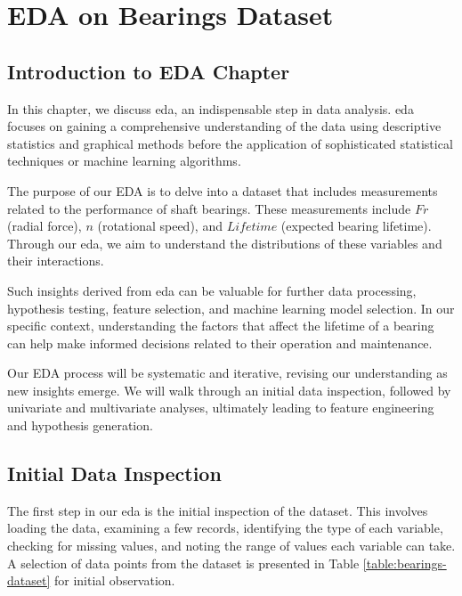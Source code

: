 \chapter{EDA on Bearings Dataset}
\label{sec:bearings-eda}


\section{Introduction to EDA Chapter}

In this chapter, we discuss \ac{eda}, an indispensable step in data analysis. \ac{eda} focuses on gaining a comprehensive understanding of the data using descriptive statistics and graphical methods before the application of sophisticated statistical techniques or machine learning algorithms.

The purpose of our EDA is to delve into a dataset that includes measurements related to the performance of shaft bearings. These measurements include \(Fr\) (radial force), \(n\) (rotational speed), and \(Lifetime\) (expected bearing lifetime). Through our \ac{eda}, we aim to understand the distributions of these variables and their interactions.

Such insights derived from \ac{eda} can be valuable for further data processing, hypothesis testing, feature selection, and machine learning model selection. In our specific context, understanding the factors that affect the lifetime of a bearing can help make informed decisions related to their operation and maintenance.

Our EDA process will be systematic and iterative, revising our understanding as new insights emerge. We will walk through an initial data inspection, followed by univariate and multivariate analyses, ultimately leading to feature engineering and hypothesis generation.


\section{Initial Data Inspection}

The first step in our \ac{eda} is the initial inspection of the dataset. This involves loading the data, examining a few records, identifying the type of each variable, checking for missing values, and noting the range of values each variable can take. A selection of data points from the dataset is presented in Table \ref{table:bearings-dataset} for initial observation.

